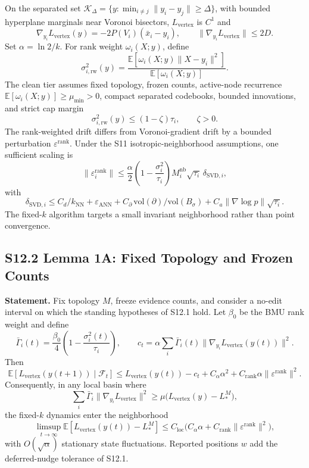 \documentclass[11pt]{article}
\begin{document}
On the separated set $\mathcal K_\Delta=\{y:\min_{i\ne j}\|y_i-y_j\|\ge\Delta\}$, with bounded hyperplane marginals near Voronoi bisectors, $L_{\mathrm{vertex}}$ is $C^1$ and
\[
\nabla_{y_i}L_{\mathrm{vertex}}(y)
=
-2P(V_i)(\bar x_i-y_i),
\qquad
\|\nabla_{y_i}L_{\mathrm{vertex}}\|\le2D.
\]
Set $\alpha=\ln2/k$. For rank weight $\omega_i(X;y)$, define
\[
\sigma_{i,\mathrm{rw}}^2(y)
=
\frac{\mathbb E[\omega_i(X;y)\|X-y_i\|^2]}
{\mathbb E[\omega_i(X;y)]}.
\]
The clean tier assumes fixed topology, frozen counts, active-node recurrence $\mathbb E[\omega_i(X;y)]\ge\mu_{\min}>0$, compact separated codebooks, bounded innovations, and strict cap margin
\[
\sigma_{i,\mathrm{rw}}^2(y)\le(1-\zeta)\tau_i,
\qquad
\zeta>0.
\]
The rank-weighted drift differs from Voronoi-gradient drift by a bounded perturbation $\varepsilon^{\mathrm{rank}}$. Under the S11 isotropic-neighborhood assumptions, one sufficient scaling is
\[
\|\varepsilon_i^{\mathrm{rank}}\|
\le
\frac{\alpha}{2}
\left(1-\frac{\sigma_i^2}{\tau_i}\right)
M_i^{\mathrm{nb}}\sqrt{\tau_i}\,\delta_{\mathrm{SVD},i},
\]
with
\[
\delta_{\mathrm{SVD},i}
\le
C_d/k_{\mathrm{NN}}
+\varepsilon_{\mathrm{ANN}}
+C_\partial\,\mathrm{vol}(\partial)/\mathrm{vol}(B_\sigma)
+C_a\|\nabla\log p\|\sqrt{\tau_i}.
\]
The fixed-$k$ algorithm targets a small invariant neighborhood rather than point convergence.

\subsection*{S12.2 Lemma 1A: Fixed Topology and Frozen Counts}
\label{lem:si-fixed-topology-neighborhood}
\textbf{Statement.} Fix topology $M$, freeze evidence counts, and consider a no-edit interval on which the standing hypotheses of S12.1 hold. Let $\beta_0$ be the BMU rank weight and define
\[
\bar\Gamma_i(t)
=
\frac{\beta_0}{4}
\left(1-\frac{\sigma_i^2(t)}{\tau_i}\right),
\qquad
c_t
=
\alpha\sum_i\bar\Gamma_i(t)
\|\nabla_{y_i}L_{\mathrm{vertex}}(y(t))\|^2.
\]
Then
\[
\mathbb E[L_{\mathrm{vertex}}(y(t+1))\mid\mathcal F_t]
\le
L_{\mathrm{vertex}}(y(t))
-c_t
+C_\alpha\alpha^2
+C_{\mathrm{rank}}\alpha\|\varepsilon^{\mathrm{rank}}\|^2.
\]
Consequently, in any local basin where
\[
\sum_i\bar\Gamma_i
\|\nabla_{y_i}L_{\mathrm{vertex}}\|^2
\ge
\mu\bigl(L_{\mathrm{vertex}}(y)-L_*^M\bigr),
\]
the fixed-$k$ dynamics enter the neighborhood
\[
\limsup_{t\to\infty}
\mathbb E[L_{\mathrm{vertex}}(y(t))-L_*^M]
\le
C_{\mathrm{loc}}
\bigl(C_\alpha\alpha
+C_{\mathrm{rank}}\|\varepsilon^{\mathrm{rank}}\|^2\bigr),
\]
with $O(\sqrt\alpha)$ stationary state fluctuations. Reported positions $w$ add the deferred-nudge tolerance of S12.1.
\end{document}
